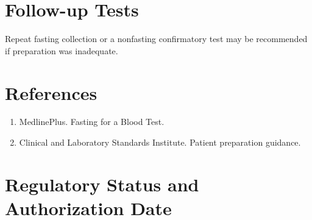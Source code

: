 \section*{Follow-up Tests} Repeat fasting collection or a nonfasting confirmatory test may be recommended if preparation was inadequate.
\section*{References} \begin{enumerate}\item MedlinePlus. Fasting for a Blood Test.\item Clinical and Laboratory Standards Institute. Patient preparation guidance.\end{enumerate}
\clearpage\section*{Regulatory Status and Authorization Date}\clearpage
